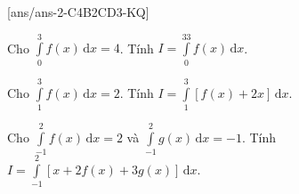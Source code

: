 [ans/ans-2-C4B2CD3-KQ]
\TNSA

\begin{ex}%
	Cho $\displaystyle\int\limits_0^3f(x)\mathrm{\,d}x=4$. Tính $I=\displaystyle\int\limits_0^33f(x)\mathrm{\,d}x$.\\
\end{ex}
\begin{ex}%
	Cho $\displaystyle\int\limits_1^3f(x)\mathrm{\,d}x=2$. Tính $I=\displaystyle\int\limits_1^3\left[f(x)+2x\right]\mathrm{\,d}x$.\\
\end{ex}

\begin{ex}%
	Cho $\displaystyle\int\limits_{-1}^2f(x)\mathrm{\,d}x=2$ và $\displaystyle\int\limits_{-1}^2g(x)\mathrm{\,d}x=-1$. Tính $ I=\displaystyle\int\limits_{-1}^2\left[x+2f(x)+3g(x)\right]\mathrm{\,d}x$.\\
\end{ex}

